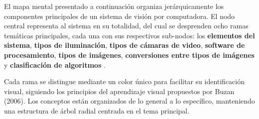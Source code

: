 \documentclass[12pt,letterpaper]{article}
\begin{document}
El mapa mental presentado a continuación organiza jerárquicamente los componentes
principales de un sistema de visión por computadora. El nodo central representa
al sistema en su totalidad, del cual se desprenden ocho ramas temáticas principales,
cada una con sus respectivos sub-nodos: los \textbf{elementos del sistema},
\textbf{tipos de iluminación}, \textbf{tipos de cámaras de video},
\textbf{software de procesamiento}, \textbf{tipos de imágenes},
\textbf{conversiones entre tipos de imágenes} y
\textbf{clasificación de algoritmos} \citep{nixon2019feature}.

Cada rama se distingue mediante un color único para facilitar su identificación
visual, siguiendo los principios del aprendizaje visual propuestos por Buzan (2006).
Los conceptos están organizados de lo general a lo específico, manteniendo una
estructura de árbol radial centrada en el tema principal.
\end{document}
